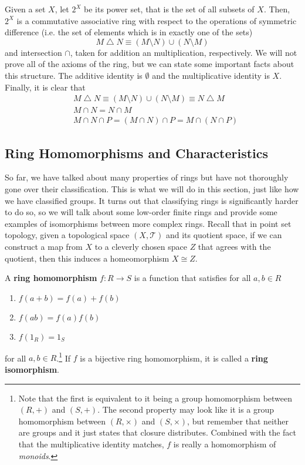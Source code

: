   \begin{example}
    Given a set $X$, let $2^X$ be its power set, that is the set of all subsets of $X$. Then, $2^X$ is a commutative associative ring with respect to the operations of symmetric difference (i.e. the set of elements which is in exactly one of the sets) 
    \begin{equation}
      M \bigtriangleup N \equiv (M \setminus N) \cup (N \setminus M)
    \end{equation}
    and intersection $\cap$, taken for addition an multiplication, respectively. We will not prove all of the axioms of the ring, but we can state some important facts about this structure. The additive identity is $\emptyset$ and the multiplicative identity is $X$. Finally, it is clear that 
    \begin{align*}
      & M \bigtriangleup N \equiv (M \setminus N) \cup (N \setminus M) \equiv N \bigtriangleup M \\
      & M \cap N = N \cap M \\
      & M \cap N \cap P = (M \cap N) \cap P = M \cap (N \cap P)
    \end{align*}
  \end{example}

\subsection{Ring Homomorphisms and Characteristics}

  So far, we have talked about many properties of rings but have not thoroughly gone over their classification. This is what we will do in this section, just like how we have classified groups. It turns out that classifying rings is significantly harder to do so, so we will talk about some low-order finite rings and provide some examples of isomorphisms between more complex rings. Recall that in point set topology, given a topological space $(X, \mathscr{T})$ and its quotient space, if we can construct a map from $X$ to a cleverly chosen space $Z$ that agrees with the quotient, then this induces a homeomorphism $X \cong Z$. 

  \begin{definition}
    A \textbf{ring homomorphism} $f: R \rightarrow S$ is a function that satisfies for all $a, b \in R$
    \begin{enumerate}
      \item $f(a + b) = f(a) + f(b)$
      \item $f(ab) = f(a) f(b)$ 
      \item $f(1_R) = 1_S$
    \end{enumerate}
    for all $a, b \in R$.\footnote{Note that the first is equivalent to it being a group homomorphism between $(R, +)$ and $(S, +)$. The second property may look like it is a group homomorphism between $(R, \times)$ and $(S, \times)$, but remember that neither are groups and it just states that closure distributes. Combined with the fact that the multiplicative identity matches, $f$ is really a homomorphism of \textit{monoids}. } If $f$ is a bijective ring homomorphism, it is called a \textbf{ring isomorphism}. 
  \end{definition} 

